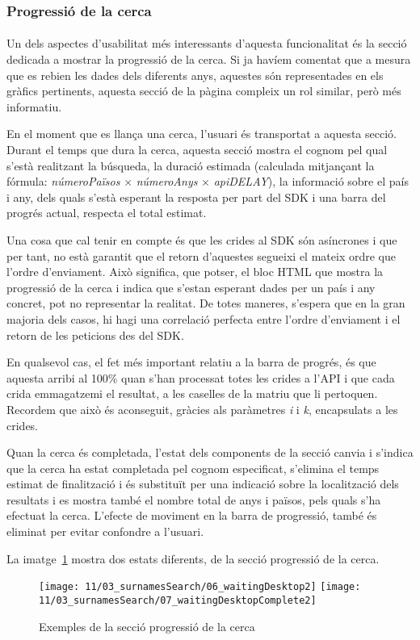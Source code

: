 \subsubsection{Progressió de la cerca}

\paragraph{}
Un dels aspectes d'usabilitat més interessants d'aquesta funcionalitat és la secció dedicada a mostrar la progressió de la cerca. Si ja havíem comentat que a mesura que es rebien les dades dels diferents anys, aquestes són representades en els gràfics pertinents, aquesta secció de la pàgina compleix un rol similar, però més informatiu.

En el moment que es llança una cerca, l'usuari és transportat a aquesta secció. Durant el temps que dura la cerca, aquesta secció mostra el cognom pel qual s'està realitzant la búsqueda, la duració estimada (calculada mitjançant la fórmula: \emph{númeroPaïsos} $\times$ \emph{númeroAnys} $\times$ \emph{apiDELAY}), la informació sobre el país i any, dels quals s'està esperant la resposta per part del SDK i una barra del progrés actual, respecta el total estimat.

Una cosa que cal tenir en compte és que les crides al SDK són asíncrones i que per tant, no està garantit que el retorn d'aquestes segueixi el mateix ordre que l'ordre d'enviament. Això significa, que potser, el bloc HTML que mostra la progressió de la cerca i indica que s’estan esperant dades per un país i any concret, pot no representar la realitat. De totes maneres, s’espera que en la gran majoria dels casos, hi hagi una correlació perfecta entre l’ordre d’enviament i el retorn de les peticions des del SDK.

En qualsevol cas, el fet més important relatiu a la barra de progrés, és que aquesta arribi al 100\% quan s'han processat totes les crides a l’API i que cada crida emmagatzemi el resultat, a les caselles de la matriu que li pertoquen. Recordem que això és aconseguit, gràcies als paràmetres \emph{i} i \emph{k}, encapsulats a les crides.

Quan la cerca és completada, l'estat dels components de la secció canvia i s'indica que la cerca ha estat completada pel cognom especificat, s'elimina el temps estimat de finalització i és substituït per una indicació sobre la localització dels resultats i es mostra també el nombre total de anys i països, pels quals s'ha efectuat la cerca. L'efecte de moviment en la barra de progressió, també és eliminat per evitar confondre a l'usuari.

La imatge~\ref{fig:waitingSurnames} mostra dos estats diferents, de la secció progressió de la cerca.

\begin{figure}[h]
    \texttt{[image: 11/03\_surnamesSearch/06\_waitingDesktop2]}
    \texttt{[image: 11/03\_surnamesSearch/07\_waitingDesktopComplete2]}
    \centering
    \caption{Exemples de la secció progressió de la cerca}\label{fig:waitingSurnames}
\end{figure}
